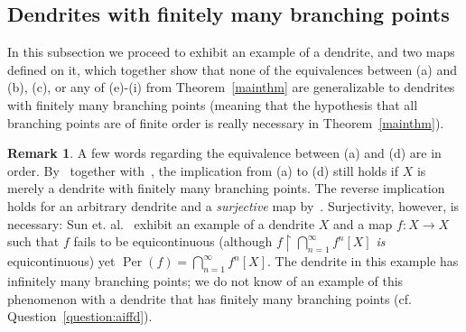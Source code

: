 \documentclass[12pt]{amsart}
\theoremstyle{definition}
\newtheorem{remark}[theorem]{Remark}
\numberwithin{equation}{section}
\DeclareMathOperator{\per}{Per}
\begin{document}
\subsection{Dendrites with finitely many branching points}

In this subsection we proceed to exhibit an example of a dendrite, and two maps defined on it, which together show that none of the equivalences between (a) and (b), (c), or any of (e)-(i) from Theorem~\ref{mainthm} are generalizable to dendrites with finitely many branching points (meaning that the hypothesis that all branching points are of finite order is really necessary in Theorem~\ref{mainthm}).

\begin{remark}\label{rem:aiffd}
A few words regarding the equivalence between (a) and (d) are in order. By~\cite[Theorem~4.12]{camargo-rincon-uzcategui} together with~\cite[Lemma~2.6]{four-chinese-authors}, the implication from (a) to (d) still holds if $X$ is merely a dendrite with finitely many branching points. The reverse implication holds for an arbitrary dendrite and a {\em surjective} map by~\cite[Theorem~5.2]{mai}. Surjectivity, however, is necessary: Sun et. 
al.~\cite[Example~2.9]{sun2014} exhibit an example of a dendrite $X$ and a map 
$f:X\longrightarrow X$ such that $f$ fails to be equicontinuous (although 
$f\upharpoonright\bigcap_{n=1}^\infty f^n[X]$ {\em is} equicontinuous) yet $\per(f)=\bigcap_{n=1}^\infty f^n[X]$. 
The dendrite in this example has infinitely many branching points; we do not know of an example of this 
phenomenon with a dendrite that has finitely many branching points (cf. Question~\ref{question:aiffd}).
\end{remark}
\end{document}
